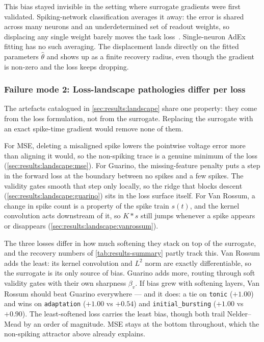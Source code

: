 This bias stayed invisible in the setting where surrogate gradients were first validated.
Spiking-network classification averages it away: the error is shared across many neurons and an underdetermined set of readout weights, so displacing any single weight barely moves the task loss~\cite{Neftci2019,Zenke2018,Perez-Nieves2021}.
Single-neuron \gls{AdEx} fitting has no such averaging.
The displacement lands directly on the fitted parameters $\hat\theta$ and shows up as a finite recovery radius, even though the gradient is non-zero and the loss keeps dropping.

\subsubsection{Failure mode 2: Loss-landscape pathologies differ per loss}\label{sec:discussion:landscape-fm}

The artefacts catalogued in \cref{sec:results:landscape} share one property: they come from the loss formulation, not from the surrogate.
Replacing the surrogate with an exact spike-time gradient would remove none of them.

For \gls{MSE}, deleting a misaligned spike lowers the pointwise voltage error more than aligning it would, so the non-spiking trace is a genuine minimum of the loss (\cref{sec:results:landscape:mse}).
For Guarino, the missing-feature penalty puts a step in the forward loss at the boundary between no spikes and a few spikes.
The validity gates smooth that step only locally, so the ridge that blocks descent (\cref{sec:results:landscape:guarino}) sits in the loss surface itself.
For Van Rossum, a change in spike count is a property of the spike train $s(t)$, and the kernel convolution acts downstream of it, so $K\ast s$ still jumps whenever a spike appears or disappears (\cref{sec:results:landscape:vanrossum}).

The three losses differ in how much softening they stack on top of the surrogate, and the recovery numbers of \cref{tab:results-summary} partly track this.
Van Rossum adds the least: its kernel convolution and $L^2$ norm are exactly differentiable, so the surrogate is its only source of bias.
Guarino adds more, routing through soft validity gates with their own sharpness $\beta_v$.
If bias grew with softening layers, Van Rossum should beat Guarino everywhere --- and it does: a tie on \texttt{tonic} ($+1.00$) and wins on \texttt{adaptation} ($+1.00$ vs $+0.54$) and \texttt{initial\_bursting} ($+1.00$ vs $+0.90$).
The least-softened loss carries the least bias, though both trail Nelder--Mead by an order of magnitude.
\gls{MSE} stays at the bottom throughout, which the non-spiking attractor above already explains.

